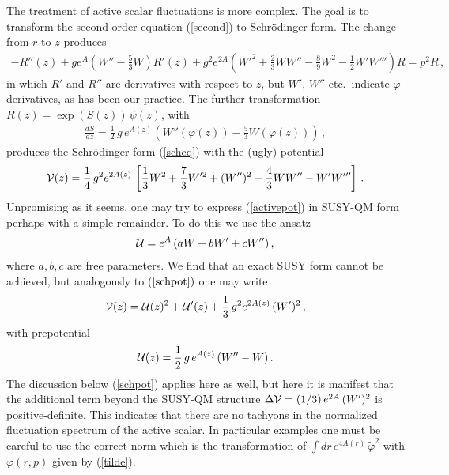 \documentclass[a4paper,12pt]{article}
\def\varphit{\tilde{\varphi}}
\begin{document}
The treatment of active scalar fluctuations is more complex.
The goal is to transform the second order equation (\ref{second}) to
Schr\"odinger form.  The change from $r$ to $z$ produces 
\begin{eqnarray}
\label{schactive}
- R''(z) + g e^A \left( W'' - \frac{5}{3} W \right)  R'(z) +
  g^2 e^{2A}  \left (W'^2 + \frac{2}{3}W W'' - \frac{8}{9} W^2 -
  \frac{1}{2} W' W''' \right) R = p^2 R \,,
\end{eqnarray}
in which $R'$ and $R''$ are derivatives with respect to $z$, but $W'$,
$W''$ etc.\ indicate $\varphi$-derivatives, as has been our practice.
The further transformation
$R(z) = \exp(S(z)) \, \psi(z)$, with
\begin{eqnarray}
\frac{dS}{dz} = \frac{1}{2} \, g \, e^{A(z)}  \left( W''(\varphi(z)) -
\frac{5}{3} W(\varphi(z)) \right) \,,
\end{eqnarray}
produces the Schr\"odinger form (\ref{scheq}) with the (ugly) potential
\begin{eqnarray}
\label{activepot}
{\cal V}(z) = \frac{1}{4} \, g^2 e^{2A(z)} \, \left[ \frac{1}{3} W^2 +
\frac{7}{3} W'^2 + (W'')^2 - \frac{4}{3} W W'' - W' W''' \right] \,.
\end{eqnarray}
Unpromising as it seems, one may try to express (\ref{activepot}) in
SUSY-QM form perhaps with a simple remainder.  To do this we use the
ansatz 
\begin{eqnarray}
{\cal U} = e^A \, (aW +bW' +cW'') \,,
\end{eqnarray}
where $a,b,c$ are free parameters. We find that an exact SUSY form
cannot be achieved, but analogously to ($\ref{schpot})$ one may write
\begin{eqnarray}
\label{activeplusremain}
{\cal V}(z) = {\cal U}(z)^2 + {\cal U}'(z) + \frac{1}{3}\, g^2 e^{2A(z)}
\, (W')^2 \,,
\end{eqnarray}
with prepotential
\begin{eqnarray}
\label{activepre}
{\cal U}(z) = \frac{1}{2} \, g \, e^{A(z)} \, (W'' - W) \,.
\end{eqnarray}
The discussion below
(\ref{schpot}) applies here as well, but here it is manifest that the
additional term beyond the SUSY-QM structure $\Delta {\cal V} = (1/3)
\, e^{2A} \, (W')^2$ is positive-definite.  This indicates that there
are no tachyons in the normalized fluctuation spectrum of the active
scalar.  In particular examples one must be careful to use the correct
norm which is the transformation of $\int dr \, e^{4A(r)}\, \varphit^2$ with
$\varphit(r,p)$ given by (\ref{tilde}).
\end{document}
